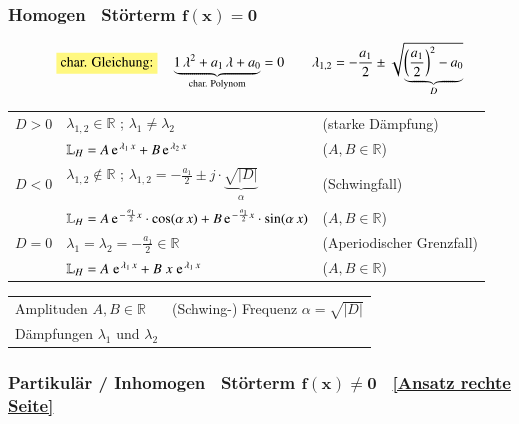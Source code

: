 \subsubsection{Homogen \textrightarrow\ Störterm $\bm{f(x) = 0}$}

\vspace{-0.3cm}

$$ \text{\colorbox{yellow!50}{char. Gleichung:}} \quad \underbrace{1 \, \lambda^2 + a_1 \, \lambda + a_0}_{\text{char. Polynom}} = 0 \qquad
\lambda_{1,2} = - \frac{a_1}{2} \pm \sqrt{\vphantom{\left(\frac{a_1}{2}\right)^2} 
\smash[b]{\underbrace{\left(\frac{a_1}{2}\right)^2 - a_0}_D}} \vphantom{\underbrace{\left(\frac{a_1}{2}\right)^2 - a_0}_D} $$

\setlength{\tabcolsep}{4pt}
\begin{tabular}{lll}
    $D > 0$ & $\lambda_{1,2} \in \mathbb{R}$ ; $\lambda_1 \neq \lambda_2$ & (starke Dämpfung)                                                                      \\ \medskip
            & $\mathbb{L}_H = A \, \e^{\lambda_1 \, x} + B \, \e^{\lambda_2 \, x}$ & ($A, B \in \mathbb{R}$)                                                        \\ 
    $D < 0$ & $\lambda_{1,2} \notin \mathbb{R}$ ; $\lambda_{1,2} = - \frac{a_1}{2} \pm j \cdot \underbrace{\sqrt{\vert D \vert}}_{\substack{\alpha}}$ & (Schwingfall)    \\ \medskip
            & $\mathbb{L}_H = A \, \e^{- \frac{a_1}{2} x} \cdot \cos(\alpha \, x) + B \, \e^{- \frac{a_1}{2} x} \cdot \sin(\alpha \, x)$ & ($A, B \in \mathbb{R}$)  \\
    $D = 0$ & $\lambda_1 = \lambda_2 = - \frac{a_1}{2} \in \mathbb{R}$ & (Aperiodischer Grenzfall)                                                                  \\
            & $\mathbb{L}_H = A \; \e^{\lambda_1 \, x} + B \; x \; \e^{\lambda_1 \, x}$ & ($A, B \in \mathbb{R}$)\\
\end{tabular}
\setlength{\tabcolsep}{6pt}

\medskip

\begin{tabular}{ll}
    Amplituden $A, B \in \mathbb{R}$        & (Schwing-) Frequenz $\alpha = \sqrt{\vert D \vert}$   \\
    Dämpfungen $\lambda_1$ und $\lambda_2$ 
\end{tabular}


\subsubsection{Partikulär / Inhomogen \textrightarrow\ Störterm $\bm{f(x) \neq 0}$ \textrightarrow\ \ref{Ansatz rechte Seite}}
\label{chap:inhomogen_n2}

